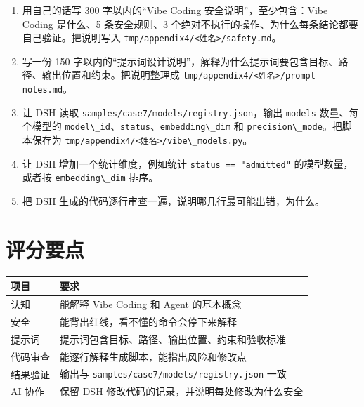 \begin{enumerate}
\def\labelenumi{\arabic{enumi}.}
\tightlist
\item
  用自己的话写 300 字以内的``Vibe Coding 安全说明''，至少包含：Vibe
  Coding 是什么、5 条安全规则、3
  个绝对不执行的操作、为什么每条结论都要自己验证。把说明写入
  \passthrough{\lstinline!tmp/appendix4/<姓名>/safety.md!}。
\item
  写一份 150
  字以内的``提示词设计说明''，解释为什么提示词要包含目标、路径、输出位置和约束。把说明整理成
  \passthrough{\lstinline!tmp/appendix4/<姓名>/prompt-notes.md!}。
\item
  让 DSH 读取
  \passthrough{\lstinline!samples/case7/models/registry.json!}，输出
  \passthrough{\lstinline!models!} 数量、每个模型的
  \passthrough{\lstinline!model\_id!}、\passthrough{\lstinline!status!}、\passthrough{\lstinline!embedding\_dim!}
  和 \passthrough{\lstinline!precision\_mode!}。把脚本保存为
  \passthrough{\lstinline!tmp/appendix4/<姓名>/vibe\_models.py!}。
\item
  让 DSH 增加一个统计维度，例如统计
  \passthrough{\lstinline!status == "admitted"!} 的模型数量，或者按
  \passthrough{\lstinline!embedding\_dim!} 排序。
\item
  把 DSH 生成的代码逐行审查一遍，说明哪几行最可能出错，为什么。
\end{enumerate}

\section{评分要点}\label{ux8bc4ux5206ux8981ux70b9}

\begin{longtable}[]{@{}ll@{}}
\toprule\noalign{}
项目 & 要求 \\
\midrule\noalign{}
\endhead
\bottomrule\noalign{}
\endlastfoot
认知 & 能解释 Vibe Coding 和 Agent 的基本概念 \\
安全 & 能背出红线，看不懂的命令会停下来解释 \\
提示词 & 提示词包含目标、路径、输出位置、约束和验收标准 \\
代码审查 & 能逐行解释生成脚本，能指出风险和修改点 \\
结果验证 & 输出与
\passthrough{\lstinline!samples/case7/models/registry.json!} 一致 \\
AI 协作 & 保留 DSH 修改代码的记录，并说明每处修改为什么安全 \\
\end{longtable}
